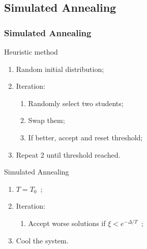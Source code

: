 \subsection{Simulated Annealing}
\begin{frame}
	\frametitle{Simulated Annealing}
	\begin{block}{Heuristic method}
		\begin{enumerate}
			\item{Random initial distribution;}
			\item{Iteration:
			\begin{enumerate}
				\item{Randomly select two students;}
				\item{Swap them;}
				\item{If better, accept and reset threshold;}
			\end{enumerate}
			}
			\item{Repeat 2 until threshold reached.}
		\end{enumerate}
	\end{block}
\pause
	\begin{block}{Simulated Annealing}
		\begin{enumerate}
			\item{$T=T_{0}\enspace$;}
			\item{Iteration:
			\begin{enumerate}
				\item{Accept worse solutions if $\xi < e^{- \Delta/T}\enspace$;}
			\end{enumerate}
			}
			\item{Cool the system.}
		\end{enumerate}
	\end{block}
\end{frame}